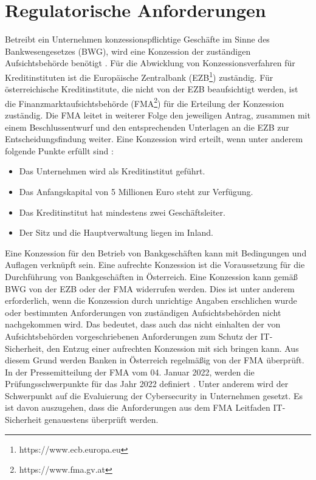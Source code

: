 \section{Regulatorische Anforderungen}
Betreibt ein Unternehmen konzessionspflichtige Geschäfte im Sinne des Bankwesengesetzes (BWG), wird eine Konzession der zuständigen Aufsichtsbehörde benötigt \autocite{ris}. Für die Abwicklung von Konzessionsverfahren für Kreditinstituten ist die Europäische Zentralbank (EZB\footnote{https://www.ecb.europa.eu}) zuständig. Für österreichische Kreditinstitute, die nicht von der EZB beaufsichtigt werden, ist die Finanzmarktaufsichtsbehörde (FMA\footnote{https://www.fma.gv.at}) für die Erteilung der Konzession zuständig. Die FMA leitet in weiterer Folge den jeweiligen Antrag, zusammen mit einem Beschlussentwurf und den entsprechenden Unterlagen an die EZB zur Entscheidungsfindung weiter. 
\bigbreak
Eine Konzession wird erteilt, wenn unter anderem folgende Punkte erfüllt sind \autocite{fma_österreich_2022}:
\begin{itemize}
    \item Das Unternehmen wird als Kreditinstitut geführt.
    \item Das Anfangskapital von 5 Millionen Euro steht zur Verfügung.
    \item Das Kreditinstitut hat mindestens zwei Geschäftsleiter.
    \item Der Sitz und die Hauptverwaltung liegen im Inland.
\end{itemize}
\bigbreak
Eine Konzession für den Betrieb von Bankgeschäften kann mit Bedingungen und Auflagen verknüpft sein. Eine aufrechte Konzession ist die Voraussetzung für die Durchführung von Bankgeschäften in Österreich.
\bigbreak
Eine Konzession kann gemäß BWG von der EZB oder der FMA widerrufen werden. Dies ist unter anderem erforderlich, wenn die Konzession durch unrichtige Angaben erschlichen wurde oder bestimmten Anforderungen von zuständigen Aufsichtsbehörden nicht nachgekommen wird. Das bedeutet, dass auch das nicht einhalten der von Aufsichtsbehörden vorgeschriebenen Anforderungen zum Schutz der IT-Sicherheit, den Entzug einer aufrechten Konzession mit sich bringen kann.
\bigbreak
Aus diesem Grund werden Banken in Österreich regelmäßig von der FMA überprüft. In der Pressemitteilung der FMA vom 04. Januar 2022, werden die Prüfungsschwerpunkte für das Jahr 2022 definiert \autocite{fma_österreich_2022_Teil2}. Unter anderem wird der Schwerpunkt auf die Evaluierung der Cybersecurity in Unternehmen gesetzt. Es ist davon auszugehen, dass die Anforderungen aus dem \glqq{}FMA Leitfaden IT-Sicherheit\grqq{} genauestens überprüft werden.

